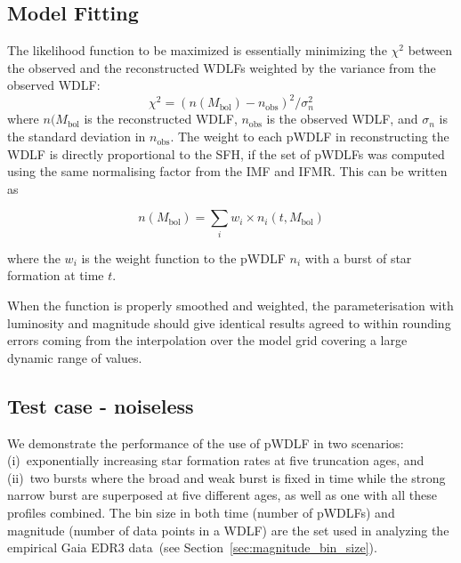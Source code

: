 \documentclass[fleqn,usenatbib]{mnras}
\begin{document}
\subsection{Model Fitting}
\label{sec:model_fitting}
The likelihood function to be maximized is essentially minimizing the $\chi^2$
between the observed and the reconstructed WDLFs weighted by the variance from
the observed WDLF:
\begin{equation}
\chi^2 = \left(n(M_\mathrm{bol}) - n_\mathrm{obs}\right)^2 / \sigma_n^2
\end{equation}
where $n(M_\mathrm{bol}$ is the reconstructed WDLF, $n_\mathrm{obs}$ is the
observed WDLF, and $\sigma_n$ is the standard deviation in $n_\mathrm{obs}$.
The weight to each pWDLF in reconstructing the WDLF is directly proportional to
the SFH, if the set of pWDLFs was computed using the same normalising factor
from the IMF and IFMR. This can be written as

\begin{equation}
    n(M_\mathrm{bol}) = \sum_i w_i \times n_i(t, M_\mathrm{bol})    
\end{equation}

where the $w_i$ is the weight function to the pWDLF $n_i$ with a burst of star
formation at time $t$.

When the function is properly smoothed and weighted, the parameterisation with
luminosity and magnitude should give identical results agreed to within
rounding errors coming from the interpolation over the model grid covering a
large dynamic range of values.

\subsection{Test case - noiseless}

We demonstrate the performance of the use of pWDLF in two scenarios:
(i)~exponentially increasing star formation rates at five truncation ages, and
(ii)~two bursts where the broad and weak burst is fixed in time while the strong
narrow burst are superposed at five different ages, as well as one with all
these profiles combined. The bin size in both time (number of pWDLFs) and
magnitude (number of data points in a WDLF) are the set used in analyzing the
empirical Gaia EDR3 data~(see Section~\ref{sec:magnitude_bin_size}).

\end{document}
